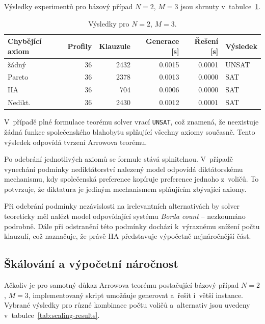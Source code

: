 \documentclass[a4paper, 11pt]{article}
\begin{document}
Výsledky experimentů pro bázový případ $N=2$, $M=3$ jsou shrnuty v~tabulce~\ref{tab:basic-results}.
\begin{table}[h]
    \centering
    \begin{tabular}{lrrrrl}
        \toprule
        Chybějící axiom & Profily & Klauzule & Generace [s] & Řešení [s] & Výsledek \\
        \midrule
        žádný           & 36      & 2432     & 0.0015       & 0.0001     & UNSAT    \\
        Pareto          & 36      & 2378     & 0.0013       & 0.0000     & SAT      \\
        IIA             & 36      & 704      & 0.0006       & 0.0000     & SAT      \\
        Nedikt.         & 36      & 2430     & 0.0012       & 0.0001     & SAT      \\
        \bottomrule
    \end{tabular}
    \caption{Výsledky pro $N=2$, $M=3$. }
    \label{tab:basic-results}
\end{table}

V~případě plné formulace teorému solver vrací \texttt{UNSAT}, což znamená, že neexistuje žádná funkce společenského blahobytu splňující všechny axiomy současně.
Tento výsledek odpovídá tvrzení Arrowova teorému.

Po odebrání jednotlivých axiomů se formule stává splnitelnou.
V~případě vynechání podmínky nediktátorství nalezený model odpovídá diktátorskému mechanismu, kdy společenská preference kopíruje preference jednoho z~voličů.
To potvrzuje, že diktatura je jediným mechanismem splňujícím zbývající axiomy.

Při odebrání podmínky nezávislosti na irelevantních alternativách by solver teoreticky měl nalézt model odpovídající systému \emph{Borda count} -- nezkoumáno podrobně.
Dále při odstranění této podmínky dochází k~výraznému snížení počtu klauzulí, což naznačuje, že právě IIA představuje výpočetně nejnáročnější část.


\subsection{Škálování a výpočetní náročnost}

Ačkoliv je pro samotný důkaz Arrowova teorému postačující bázový případ $N=2$, $M=3$, implementovaný skript umožňuje generovat a~řešit i~větší instance.
Vybrané výsledky pro různé kombinace počtu voličů a~alternativ jsou uvedeny v~tabulce~\ref{tab:scaling-results}.
\end{document}
